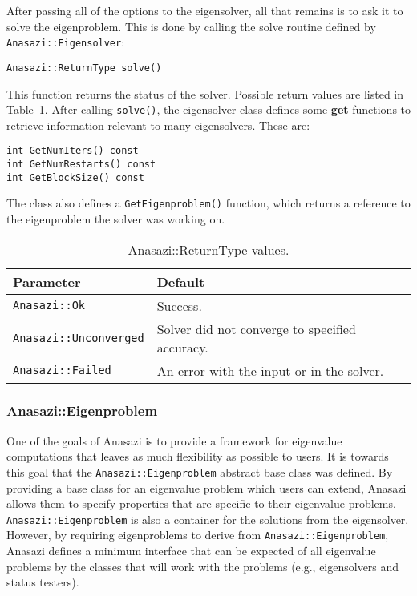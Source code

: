 After passing all of the options to the eigensolver, all that remains is to ask
it to solve the eigenproblem. This is done by calling the solve routine 
defined by \verb!Anasazi::Eigensolver!:
\begin{verbatim}
Anasazi::ReturnType solve()
\end{verbatim}
This function returns the status of the solver. Possible return values are
listed in Table~\ref{tab:anasazi:rt}. After calling \verb!solve()!, the
eigensolver class defines some \textbf{get} functions to retrieve information
relevant to many eigensolvers. These are:
\begin{verbatim}
int GetNumIters() const
int GetNumRestarts() const
int GetBlockSize() const 
\end{verbatim}
The class also defines a \verb!GetEigenproblem()! function, which returns a
reference to the eigenproblem the solver was working on.

\begin{table}
\begin{center}
\begin{tabular}{| p{4cm} l |}
\hline
Parameter & Default \\
\hline
\verb!Anasazi::Ok!         & Success. \\
\verb!Anasazi::Unconverged!& Solver did not converge to specified accuracy. \\
\verb!Anasazi::Failed!     & An error with the input or in the solver. \\
\hline
\end{tabular}
\caption{Anasazi::ReturnType values.}
\label{tab:anasazi:rt}
\end{center}
\end{table}

\subsubsection{Anasazi::Eigenproblem}
\label{sec:anasazi:eigenproblem}

One of the goals of Anasazi is to provide a framework for eigenvalue
computations that leaves as much flexibility as possible to users. It is
towards this goal that the \verb!Anasazi::Eigenproblem! abstract base class was
defined. By providing a base class for an eigenvalue problem which users can
extend, Anasazi allows them to specify properties that are specific to
their eigenvalue problems. \verb!Anasazi::Eigenproblem! is also a container for
the solutions from the eigensolver. However, by requiring eigenproblems to
derive from \verb!Anasazi::Eigenproblem!, Anasazi defines a minimum interface
that can be expected of all eigenvalue problems by the classes that will work
with the problems (e.g., eigensolvers and status testers).

